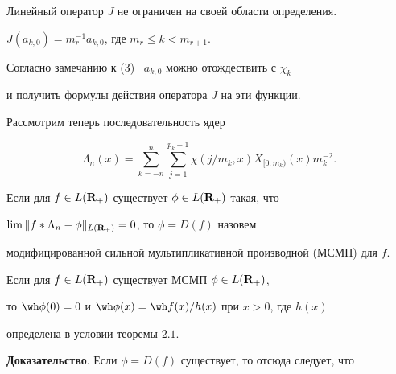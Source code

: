 \begin{cors}


Линейный оператор $J$ не ограничен на своей области определения.


\end{cors}








\begin{cors}


$J(a_{k,0})=m_r^{-1}a_{k,0}$, где $m_r\leq k<m_{r+1}$. 


\end{cors}





Согласно замечанию к (3) \ $a_{k,0}$ можно отождествить с $\chi_k$ 


и получить формулы действия оператора $J$ на эти функции.





Рассмотрим теперь последовательность ядер


$$


\Lambda_n(x)=\sum^n_{k=-n}


\sum_{j=1}^{p_k-1}\chi(j/m_k,x)X_{[0;m_k)}(x)m^{-2}_k.


$$


Если для $f\in L({\bold R}_+)$ существует $\phi\in L({\bold R}_+)$ такая, что


$\lim\|f*\Lambda_n-\phi\|_{L({\bold R}_+)}=0$, то $\phi=D(f)$ назовем 


модифицированной сильной мультипликативной производной (МСМП) для $f$.








\begin{thms} 


Если для $f\in L({\bold R}_+)$ существует МСМП $\phi\in L({\bold R}_+)$,


то ${\wh\phi}(0)=0$ и ${\wh\phi}(x)={\wh f}(x)/h(x)$ при $x>0$, где $h(x)$ 


определена в условии теоремы $2.1$.


\end{thms}








{\bf Доказательство}. Если $\phi=D(f)$ существует, то отсюда следует, что


